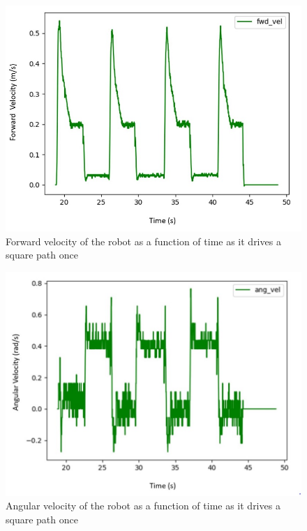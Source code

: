 \documentclass[journal]{IEEEtran}
\begin{document}
\begin{figure}[h]
\begin{center}
\includegraphics[width=1\linewidth]{image_1/figure_1_6_2_linear.jpg}
\end{center}
   \caption{Forward velocity of the robot as a function of time as it drives a square path once}
   \label{figure_1_6_2_linear}
\end{figure}

\begin{figure}[h]
\begin{center}
\includegraphics[width=1\linewidth]{image_1/figure_1_6_2_angular.jpg}
\end{center}
   \caption{Angular velocity of the robot as a function of time as it drives a square path once}
   \label{figure_1_6_2_angular}
\end{figure}
\end{document}
